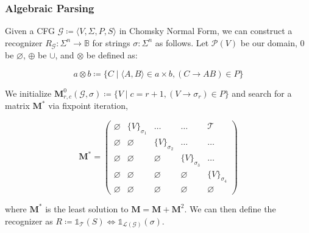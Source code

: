 \documentclass{beamer}
\begin{document}
    \begin{frame}
        \frametitle{Algebraic Parsing}
        Given a CFG $\mathcal{G} \coloneqq \langle V, \Sigma, P, S\rangle$ in Chomsky Normal Form, we can construct a recognizer $R_\mathcal{G}: \Sigma^n \rightarrow \mathbb{B}$ for strings $\sigma: \Sigma^n$ as follows. Let $\mathcal P(V)$ be our domain, $0$ be $\varnothing$, $\oplus$ be $\cup$, and $\otimes$ be defined as:

        \vspace{-7pt}
        \[
            a \otimes b \coloneqq \{C \mid \langle A, B\rangle \in a \times b, (C\rightarrow AB) \in P\}
        \]

        \noindent We initialize $\mathbf{M}^0_{r,c}(\mathcal{G}, \sigma) \coloneqq \{V \mid c = r + 1, (V \rightarrow \sigma_r) \in P\}$ and search for a matrix $\mathbf{M}^*$ via fixpoint iteration,

        \vspace{-5}
        \[
            \mathbf{M}^* = \begin{pmatrix}
                               \varnothing & \{V\}_{\sigma_1} & \ldots & \ldots & \mathcal{T} \\
                               \varnothing & \varnothing & \{V\}_{\sigma_2} & \ldots & \ldots \\
                               \varnothing & \varnothing & \varnothing & \{V\}_{\sigma_3} & \ldots \\
                               \varnothing & \varnothing & \varnothing & \varnothing & \{V\}_{\sigma_4} \\
                               \varnothing & \varnothing & \varnothing & \varnothing & \varnothing
            \end{pmatrix}
        \]

        \noindent where $\mathbf{M}^*$ is the least solution to $\mathbf{M} = \mathbf{M} + \mathbf{M}^2$. We can then define the recognizer as $R \coloneqq \mathds{1}_{\mathcal{T}}(S) \iff \mathds{1}_{\mathcal{L}(\mathcal{G})}(\sigma)$.
    \end{frame}
\end{document}
